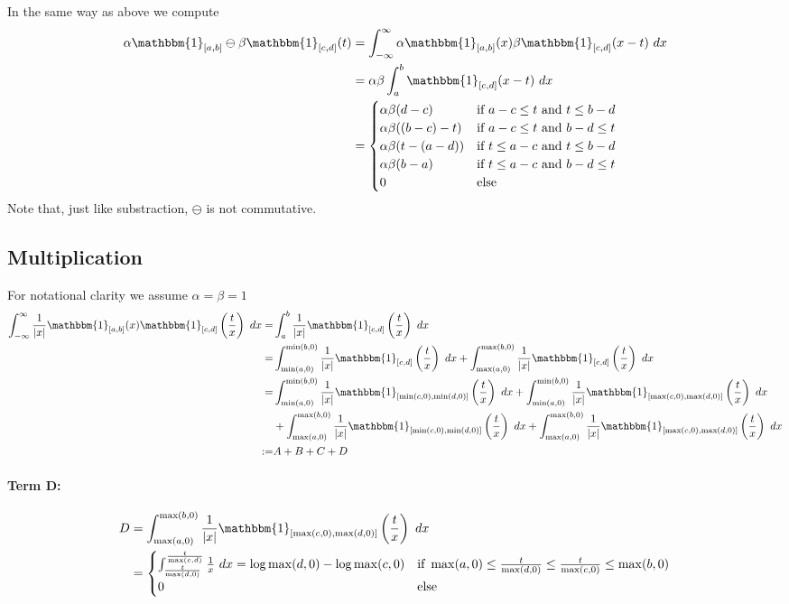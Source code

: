 \documentclass[10pt,a4paper]{article}
\theoremstyle{plain}
\theoremstyle{definition}
\newcommand{\one}{\mathbbm{1}}
\newcommand{\absv}[1]{\vert #1\vert}
\begin{document}
In the same way as above we compute 
\begin{align*}
\alpha\one_{[a,b]}\ominus\beta\one_{[c,d]}(t)&=\int_{-\infty}^{\infty} \alpha\one_{[a,b]}(x)\beta\one_{[c,d]}(x-t)~dx\\
&=\alpha\beta\int_a^b \one_{[c,d]}(x-t)~dx\\
&=\begin{cases}
\alpha\beta(d-c)&\text{if }a-c\leq t\text{ and }t\leq b-d\\
\alpha\beta((b-c)-t) &\text{if }a-c\leq t\text{ and }b-d\leq t\\
\alpha\beta(t-(a-d)) & \text{if }t\leq a-c\text{ and }t\leq b-d\\
\alpha\beta(b-a) & \text{if } t\leq a-c\text{ and }b-d\leq t\\
0&\text{else}
\end{cases}
\end{align*}
Note that, just like substraction, $\ominus$ is not commutative.

\subsection{Multiplication}
For notational clarity we assume $\alpha=\beta=1$
\begin{align*}
\int_{-\infty}^\infty \frac{1}{\absv{x}}\one_{[a,b]}(x)\one_{[c,d]}\left(\frac{t}{x}\right)~dx = &\int_{a}^b \frac{1}{\absv{x}}\one_{[c,d]}\left(\frac{t}{x}\right)~dx\\
=& \int_{\min(a,0)}^{\min(b,0)}\frac{1}{\absv{x}}\one_{[c,d]}\left(\frac{t}{x}\right)~dx+\int_{\max(a,0)}^{\max(b,0)}\frac{1}{\absv{x}}\one_{[c,d]}\left(\frac{t}{x}\right)~dx\\
=& \int_{\min(a,0)}^{\min(b,0)}\frac{1}{\absv{x}}\one_{[\min(c,0),\min(d,0)]}\left(\frac{t}{x}\right)~dx+\int_{\min(a,0)}^{\min(b,0)}\frac{1}{\absv{x}}\one_{[\max(c,0),\max(d,0)]}\left(\frac{t}{x}\right)~dx \\
& +\int_{\max(a,0)}^{\max(b,0)}\frac{1}{\absv{x}}\one_{[\min(c,0),\min(d,0)]}\left(\frac{t}{x}\right)~dx+\int_{\max(a,0)}^{\max(b,0)}\frac{1}{\absv{x}}\one_{[\max(c,0),\max(d,0)]}\left(\frac{t}{x}\right)~dx\\
:= & A+B+C+D
\end{align*}

\paragraph{Term D:}
\begin{align*}
D& =\int_{\max(a,0)}^{\max(b,0)}\frac{1}{\absv{x}}\one_{[\max(c,0),\max(d,0)]}\left(\frac{t}{x}\right)~dx\\
&=\begin{cases}
\int_{\frac{t}{\max(d,0)}}^{\frac{t}{\max(c,d)}}\frac{1}{x}~dx=\log\max(d,0)-\log\max(c,0)&\text{if }\max(a,0)\leq \frac{t}{\max(d,0)}\leq \frac{t}{\max(c,0)}\leq \max(b,0)\\
0&\text{else}
\end{cases}
\end{align*}
\end{document}
